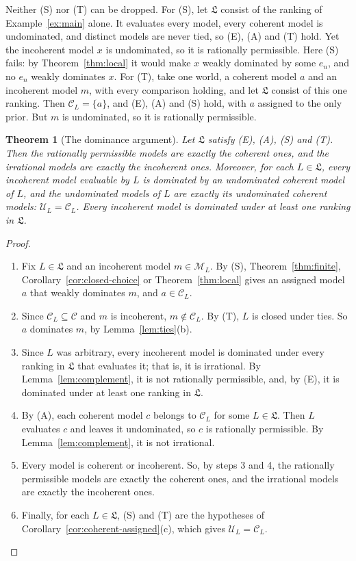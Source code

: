 \documentclass[11pt]{article}
\newtheorem{theorem}{Theorem}[section]
\theoremstyle{definition}
\theoremstyle{remark}
\newcommand{\M}{\mathcal M}
\newcommand{\C}{\mathcal C}
\newcommand{\U}{\mathcal U}
\newcommand{\Lf}{\mathfrak L}
\begin{document}
Neither (S) nor (T) can be dropped. For (S), let $\Lf$ consist of the ranking of Example~\ref{ex:main} alone. It evaluates every model, every coherent model is undominated, and distinct models are never tied, so (E), (A) and (T) hold. Yet the incoherent model $x$ is undominated, so it is rationally permissible. Here (S) fails: by Theorem~\ref{thm:local} it would make $x$ weakly dominated by some $e_n$, and no $e_n$ weakly dominates $x$. For (T), take one world, a coherent model $a$ and an incoherent model $m$, with every comparison holding, and let $\Lf$ consist of this one ranking. Then $\C_L=\{a\}$, and (E), (A) and (S) hold, with $a$ assigned to the only prior. But $m$ is undominated, so it is rationally permissible.

\begin{theorem}[The dominance argument]\label{thm:argument}
Let $\Lf$ satisfy (E), (A), (S) and (T). Then the rationally permissible models are exactly the coherent ones, and the irrational models are exactly the incoherent ones. Moreover, for each $L\in\Lf$, every incoherent model evaluable by $L$ is dominated by an undominated coherent model of $L$, and the undominated models of $L$ are exactly its undominated coherent models: $\U_L=\C_L$. Every incoherent model is dominated under at least one ranking in $\Lf$.
\end{theorem}
\begin{proof}
\leavevmode
\begin{enumerate}[label=\arabic*.,leftmargin=*]
\item Fix $L\in\Lf$ and an incoherent model $m\in\M_L$. By (S), Theorem~\ref{thm:finite}, Corollary~\ref{cor:closed-choice} or Theorem~\ref{thm:local} gives an assigned model $a$ that weakly dominates $m$, and $a\in\C_L$.
\item Since $\C_L\subseteq\C$ and $m$ is incoherent, $m\notin\C_L$. By (T), $L$ is closed under ties. So $a$ dominates $m$, by Lemma~\ref{lem:ties}(b).
\item Since $L$ was arbitrary, every incoherent model is dominated under every ranking in $\Lf$ that evaluates it; that is, it is irrational. By Lemma~\ref{lem:complement}, it is not rationally permissible, and, by (E), it is dominated under at least one ranking in $\Lf$.
\item By (A), each coherent model $c$ belongs to $\C_L$ for some $L\in\Lf$. Then $L$ evaluates $c$ and leaves it undominated, so $c$ is rationally permissible. By Lemma~\ref{lem:complement}, it is not irrational.
\item Every model is coherent or incoherent. So, by steps 3 and 4, the rationally permissible models are exactly the coherent ones, and the irrational models are exactly the incoherent ones.
\item Finally, for each $L\in\Lf$, (S) and (T) are the hypotheses of Corollary~\ref{cor:coherent-assigned}(c), which gives $\U_L=\C_L$.\qedhere
\end{enumerate}
\end{proof}
\end{document}
